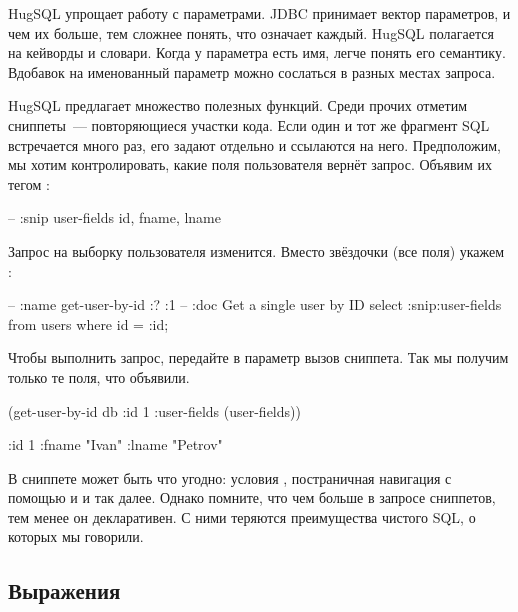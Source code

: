 HugSQL упрощает работу с параметрами. JDBC принимает вектор параметров, и чем их больше, тем сложнее понять, что означает каждый. HugSQL полагается на кейворды и словари. Когда у параметра есть имя, легче понять его семантику. Вдобавок на именованный параметр можно сослаться в разных местах запроса.


HugSQL предлагает множество полезных функций. Среди прочих отметим сниппеты~--- повторяющиеся участки кода. Если один и тот же фрагмент SQL встречается много раз, его задают отдельно и ссылаются на него. Предположим, мы хотим контролировать, какие поля пользователя вернёт запрос. Объявим их тегом :

\begin{english}
  \begin{sql}
-- :snip user-fields
id, fname, lname
  \end{sql}
\end{english}

Запрос на выборку пользователя изменится. Вместо звёздочки (все поля) укажем :

\begin{english}
  \begin{sql}
-- :name get-user-by-id :? :1
-- :doc Get a single user by ID
select :snip:user-fields from users
where id = :id;
  \end{sql}
\end{english}

Чтобы выполнить запрос, передайте в параметр  вызов сниппета. Так мы получим только те поля, что объявили.

\begin{english}
  \begin{clojure}
(get-user-by-id db
                {:id 1 :user-fields (user-fields)})

{:id 1
 :fname "Ivan"
 :lname "Petrov"}
  \end{clojure}
\end{english}

В сниппете может быть что угодно: условия , постраничная навигация с помощью  и  и так далее. Однако помните, что чем больше в запросе сниппетов, тем менее он декларативен. С ними теряются преимущества чистого SQL, о которых мы говорили.

\subsection{Выражения}

